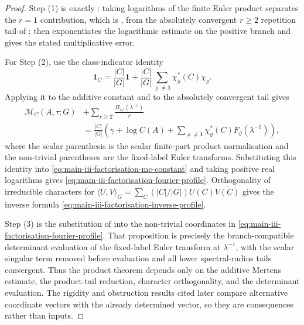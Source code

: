 \documentclass[11pt,a4paper]{amsart}
\theoremstyle{plain}
\theoremstyle{definition}
\theoremstyle{remark}
\begin{document}
\begin{proof}
  Step \textup{(1)} is exactly
  : taking logarithms of
  the finite Euler product separates the \(r=1\) contribution, which is
  , from the
  absolutely convergent \(r\ge2\) repetition tail of
  ;
   then exponentiates the
  logarithmic estimate on the positive branch and gives the stated
  multiplicative error.

  For Step \textup{(2)}, use the class-indicator identity
  \[
    \mathbf1_C=\frac{|C|}{|G|}\mathbf1+\frac{|C|}{|G|}
      \sum_{\varrho\ne\mathbf1}\chi_\varrho^\ast(C)\chi_\varrho .
  \]
  Applying it to the additive constant and to the absolutely convergent tail
  gives
  \[
  \begin{aligned}
    \mathcal M_C(A,\tau;G)&+
      \sum_{r\ge2}\frac{\Pi_{\mathbf1_C}(\lambda^{-r})}{r} \\
    &=\frac{|C|}{|G|}
      \left(
        \gamma+\log C(A)+
        \sum_{\varrho\ne\mathbf1}
          \chi_\varrho^\ast(C)F_\varrho(\lambda^{-1})
      \right),
  \end{aligned}
  \]
  where the scalar parenthesis is the scalar finite-part product
  normalisation and the non-trivial parentheses are the fixed-label Euler
  transforms.  Substituting this identity into
  \eqref{eq:main-iii-factorisation-mc-constant} and taking positive real logarithms
  gives \eqref{eq:main-iii-factorisation-fourier-profile}.  Orthogonality of
  irreducible characters for
  \(\langle U,V\rangle_G=\sum_C(|C|/|G|)U(C)\overline{V(C)}\) gives the inverse
  formula \eqref{eq:main-iii-factorisation-inverse-profile}.

  Step \textup{(3)} is the substitution of
   into the non-trivial coordinates
  in \eqref{eq:main-iii-factorisation-fourier-profile}.  That proposition is precisely
  the branch-compatible determinant evaluation of the fixed-label Euler
  transform at \(\lambda^{-1}\), with the scalar singular term removed before
  evaluation and all lower spectral-radius tails convergent.  Thus the product
  theorem depends only on the additive Mertens estimate, the product-tail
  reduction, character orthogonality, and the determinant evaluation.  The
  rigidity and obstruction results cited later compare alternative coordinate
  vectors with the already determined vector, so they are consequences rather
  than inputs.
\end{proof}
\end{document}
